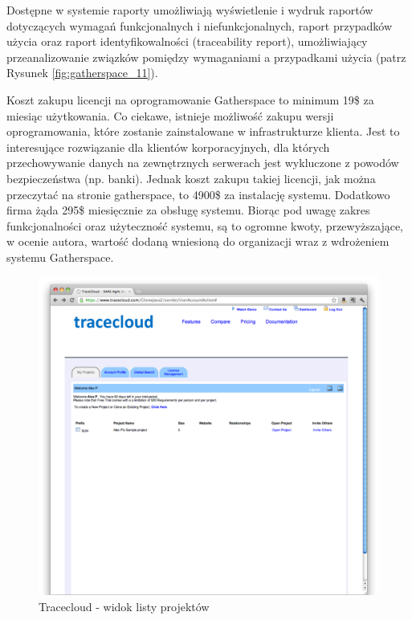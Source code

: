         Dostępne w systemie raporty umożliwiają wyświetlenie i wydruk raportów dotyczących wymagań funkcjonalnych i niefunkcjonalnych, raport przypadków użycia oraz raport identyfikowalności (traceability report), umożliwiający przeanalizowanie związków pomiędzy wymaganiami a przypadkami użycia (patrz Rysunek \ref{fig:gatherspace_11}). 

        \pagebreak

        Koszt zakupu licencji na oprogramowanie Gatherspace to minimum 19\$ za miesiąc użytkowania. Co ciekawe, istnieje możliwość zakupu wersji oprogramowania, które zostanie zainstalowane w infrastrukturze klienta. Jest to interesujące rozwiązanie dla klientów korporacyjnych, dla których przechowywanie danych na zewnętrznych serwerach jest wykluczone z powodów bezpieczeństwa (np. banki). Jednak koszt zakupu takiej licencji, jak można przeczytać na stronie gatherspace, to 4900\$ za instalację systemu. Dodatkowo firma żąda 295\$ miesięcznie za obsługę systemu. Biorąc pod uwagę zakres funkcjonalności oraz użyteczność systemu, są to ogromne kwoty, przewyższające, w ocenie autora, wartość dodaną wniesioną do organizacji wraz z wdrożeniem systemu Gatherspace.
         
        \begin{figure}[t]
          \centering
          \includegraphics[width=1.0\textwidth]{img/tracecloud_1.pdf}
          \caption{Tracecloud - widok listy projektów}
          \label{fig:tracecloud_1}
        \end{figure}

